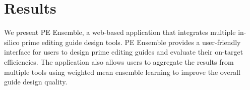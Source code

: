 \section{Results}

We present PE Ensemble, a web-based application that integrates multiple in-silico prime editing guide design tools. PE Ensemble provides a user-friendly interface for users to design prime editing guides and evaluate their on-target efficiencies. The application also allows users to aggregate the results from multiple tools using weighted mean ensemble learning to improve the overall guide design quality.